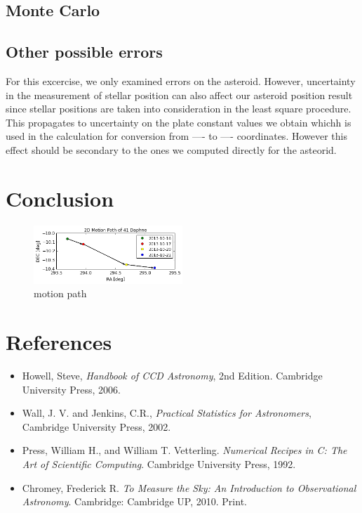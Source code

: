 \documentclass[authoryear, 12pt,5p, times]{elsarticle}
\begin{document}
\subsection{Monte Carlo}
\subsection{Other possible errors}
For this excercise, we only examined errors on the asteroid. However, uncertainty in the measurement of stellar position can also affect our asteroid position result since stellar positions are taken into consideration in the least square procedure. This propagates to uncertainty on the plate constant values we obtain whichh is used in the calculation for conversion from ---- to ---- coordinates. However this effect should be secondary to the ones we computed directly for the asteorid. 
\section{Conclusion}
\begin{figure}[h!]
\includegraphics[width=0.5\textwidth]{figures/motion_path}
\caption{ motion path}
\label{motion_path}
\end{figure}
 \section{References}
%
\begin{itemize}
\item Howell, Steve,  \textit{Handbook of CCD Astronomy}, 2nd Edition. Cambridge University Press, 2006.
\item Wall, J. V. and Jenkins, C.R., \textit{Practical Statistics for Astronomers}, Cambridge University Press, 2002.
\item Press, William H., and William T. Vetterling. \textit{Numerical Recipes in C: The Art of Scientific Computing}. Cambridge University Press, 1992. 
\item Chromey, Frederick R. \textit{To Measure the Sky: An Introduction to Observational Astronomy}. Cambridge: Cambridge UP, 2010. Print.
\end{itemize}
\end{document}
